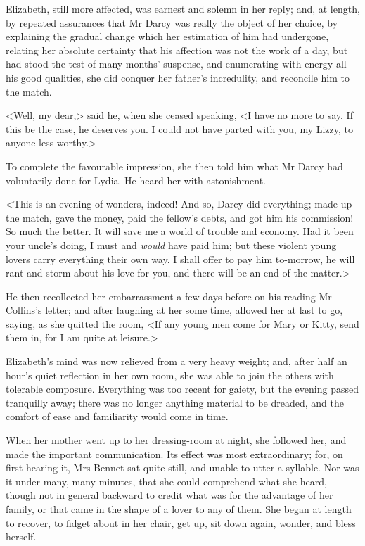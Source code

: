 Elizabeth, still more affected, was earnest and solemn in her reply; and, at length, by repeated assurances that Mr Darcy was really the object of her choice, by explaining the gradual change which her estimation of him had undergone, relating her absolute certainty that his affection was not the work of a day, but had stood the test of many months' suspense, and enumerating with energy all his good qualities, she did conquer her father's incredulity, and reconcile him to the match.

<Well, my dear,> said he, when she ceased speaking, <I have no more to say. If this be the case, he deserves you. I could not have parted with you, my Lizzy, to anyone less worthy.>

To complete the favourable impression, she then told him what Mr Darcy had voluntarily done for Lydia. He heard her with astonishment.

<This is an evening of wonders, indeed! And so, Darcy did everything; made up the match, gave the money, paid the fellow's debts, and got him his commission! So much the better. It will save me a world of trouble and economy. Had it been your uncle's doing, I must and \textit{would} have paid him; but these violent young lovers carry everything their own way. I shall offer to pay him to-morrow, he will rant and storm about his love for you, and there will be an end of the matter.>

He then recollected her embarrassment a few days before on his reading Mr Collins's letter; and after laughing at her some time, allowed her at last to go, saying, as she quitted the room, <If any young men come for Mary or Kitty, send them in, for I am quite at leisure.>

Elizabeth's mind was now relieved from a very heavy weight; and, after half an hour's quiet reflection in her own room, she was able to join the others with tolerable composure. Everything was too recent for gaiety, but the evening passed tranquilly away; there was no longer anything material to be dreaded, and the comfort of ease and familiarity would come in time.

When her mother went up to her dressing-room at night, she followed her, and made the important communication. Its effect was most extraordinary; for, on first hearing it, Mrs Bennet sat quite still, and unable to utter a syllable. Nor was it under many, many minutes, that she could comprehend what she heard, though not in general backward to credit what was for the advantage of her family, or that came in the shape of a lover to any of them. She began at length to recover, to fidget about in her chair, get up, sit down again, wonder, and bless herself.

